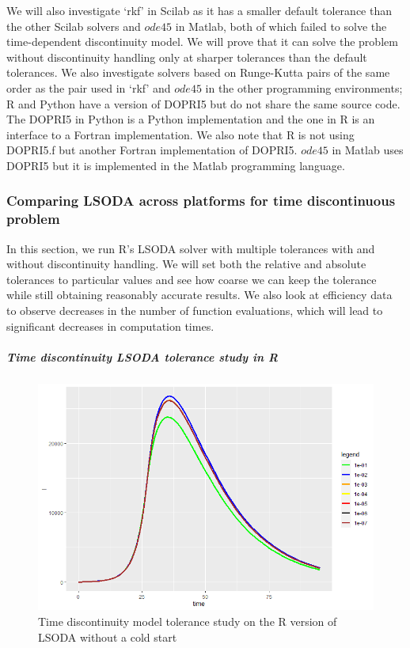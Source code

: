 We will also investigate `rkf' in Scilab as it has a smaller default tolerance than the other Scilab solvers and $ode45$ in Matlab, both of which failed to solve the time-dependent discontinuity model. We will prove that it can solve the problem without discontinuity handling only at sharper tolerances than the default tolerances. We also investigate solvers based on Runge-Kutta pairs of the same order as the pair used in `rkf' and $ode45$ in the other programming environments; R and Python have a version of DOPRI5 but do not share the same source code. The DOPRI5 in Python is a Python implementation and the one in R is an interface to a Fortran implementation. We also note that R is not using DOPRI5.f but another Fortran implementation of DOPRI5. $ode45$ in Matlab uses DOPRI5 but it is implemented in the Matlab programming language.

\subsubsection{Comparing LSODA across platforms for time discontinuous problem}

In this section, we run R's LSODA solver with multiple tolerances with and without discontinuity handling. We will set both the relative and absolute tolerances to particular values and see how coarse we can keep the tolerance while still obtaining reasonably accurate results. We also look at efficiency data to observe decreases in the number of function evaluations, which will lead to significant decreases in computation times.

\subparagraph{Time discontinuity LSODA tolerance study in R}
\begin{figure}[h]
\centering
\includegraphics[width=0.7\linewidth]{./figures/tolerance_time_lsoda_no_event_R}
\caption{Time discontinuity model tolerance study on the R version of LSODA without a cold start}
\label{fig:tolerance_time_lsoda_no_event_R}
\end{figure}

